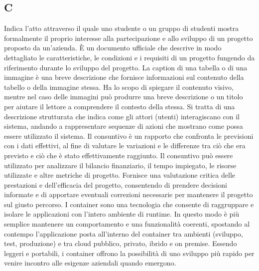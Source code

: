 \begin{center}
\section*{C}
\end{center}
Indica l'atto attraverso il quale uno studente o un gruppo di studenti mostra formalmente il proprio interesse alla partecipazione e allo sviluppo di un progetto proposto da un'azienda.
È un documento ufficiale che descrive in modo dettagliato le caratteristiche, le condizioni e i requisiti di un progetto fungendo da riferimento durante lo sviluppo del progetto.
La caption di una tabella o di una immagine è una breve descrizione che fornisce informazioni sul contenuto della tabello o della immagine stessa. Ha lo scopo di spiegare il contenuto visivo, mentre nel caso delle immagini può produrre una breve descrizione o un titolo per aiutare il lettore a comprendere il contesto della stessa.
Si tratta di una descrizione strutturata che indica come gli attori (utenti) interagiscano con il sistema, andando a rappresentare sequenze di azioni che mostrano come possa essere utilizzato il sistema.
Il consuntivo è un rapporto che confronta le previsioni con i dati effettivi, al fine di valutare le variazioni e le differenze tra ciò che era previsto e ciò che è stato effettivamente raggiunto. Il consuntivo può essere utilizzato per analizzare il bilancio finanziario, il tempo impiegato, le risorse utilizzate e altre metriche di progetto. Fornisce una valutazione critica delle prestazioni e dell'efficacia del progetto, consentendo di prendere decisioni informate e di apportare eventuali correzioni necessarie per mantenere il progetto sul giusto percorso.
I container sono una tecnologia che consente di raggruppare e isolare le applicazioni con l'intero ambiente di runtime. In questo modo è più semplice mantenere un comportamento e una funzionalità coerenti, spostando al contempo l'applicazione posta all'interno del container tra ambienti (sviluppo, test, produzione) e tra cloud pubblico, privato, ibrido e on premise. Essendo leggeri e portabili, i container offrono la possibilità di uno sviluppo più rapido per venire incontro alle esigenze aziendali quando emergono.
